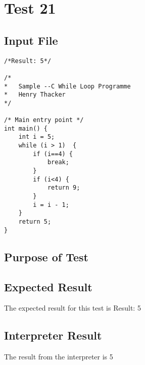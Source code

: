 \section{Test 21}
\subsection{Input File}
\begin{verbatim}
/*Result: 5*/

/*
*	Sample --C While Loop Programme
*	Henry Thacker
*/

/* Main entry point */
int main() {
	int i = 5;
	while (i > 1)  {
		if (i==4) {
			break;
		}
		if (i<4) {
			return 9;
		}
		i = i - 1;
	}
	return 5;
}\end{verbatim}\subsection{Purpose of Test}

\subsection{Expected Result}
The expected result for this test is Result: 5
\subsection{Interpreter Result}
The result from the interpreter is 5
